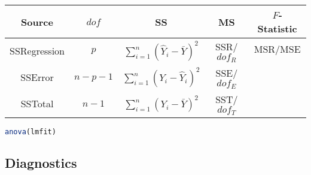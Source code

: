     \begin{table}[H]
        \label{TableMultivariateANOVA}
        \centering
        \renewcommand\arraystretch{1}
        \begin{tabular}{c|cccc}
            \hline
            Source&$ dof $&SS&MS&$ F $-Statistic\\\hline
            SSRegression&$ p $&$ \sum_{i=1}^n(\hat{Y}_i-\bar{Y})^2  $&SSR/$ dof_R $& $ \mathrm{MSR}/\mathrm{MSE} $\\
            SSError&$ n-p-1 $&$ \sum_{i=1}^n(Y_i-\hat{Y}_i)^2  $&SSE/$ dof_E $& \\
            SSTotal&$ n-1 $&$ \sum_{i=1}^n(Y_i-\bar{Y})^2  $&SST/$ dof_T $& \\
            \hline
        \end{tabular}
    \end{table}
\begin{rcode}
    \begin{lstlisting}[language=R]
anova(lmfit)
    \end{lstlisting}
\end{rcode}    






     




\subsection{Diagnostics}\label{SubSectionDiagnosticsForMonoModel}


\providecommand{\cmark}[2][]{%
  \begin{pgfonlayer}{marx}
    \node [nmark] at (c#2#1) {#2};
  \end{pgfonlayer}{marx}
  } 
\providecommand{\cmark}[2][]{\relax} 

